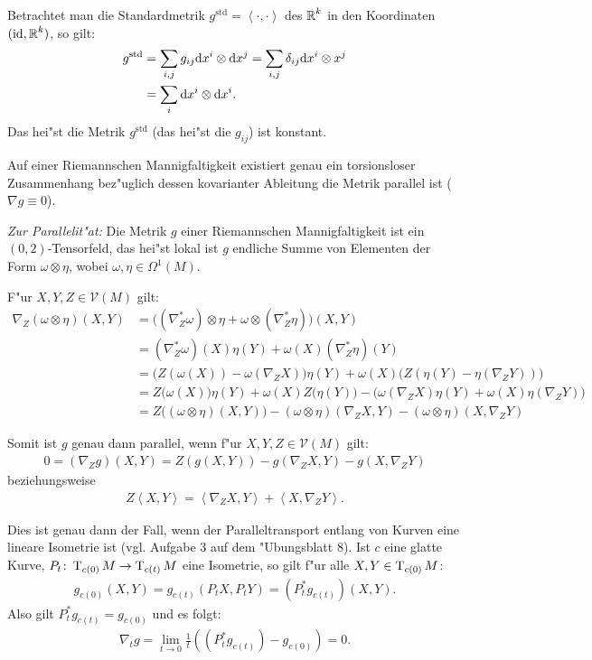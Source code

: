 Betrachtet man die Standardmetrik $g^{\text{std}} = \left<\cdot,\cdot\right>$ des $\operatorname{\mathbb{R}}^k$ in den Koordinaten $(\operatorname{id}, \operatorname{\mathbb{R}}^k)$, so gilt:
\begin{align*}
  g^{\text{std}} & = \sum_{i,j} g_{ij} \mathrm{d} x^i \otimes \mathrm{d} x^j = \sum_{i,j} \delta_{ij} \mathrm{d} x^i \otimes x^j\\
  & = \sum_i \mathrm{d} x^i \otimes \mathrm{d} x^i.
\end{align*}
Das hei"st die Metrik $g^{\text{std}}$ (das hei"st die $g_{ij}$) ist konstant.

\begin{Satz} \label{satz-7-12}
  Auf einer Riemannschen Mannigfaltigkeit existiert genau ein torsionsloser Zusammenhang bez"uglich dessen kovarianter Ableitung die Metrik parallel ist ($\nabla g \equiv 0$).
\end{Satz}

\emph{Zur Parallelit"at:} Die Metrik $g$ einer Riemannschen Mannigfaltigkeit ist ein $(0,2)$-Tensorfeld, das hei"st lokal ist $g$ endliche Summe von Elementen der Form $\omega \otimes \eta$, wobei $\omega, \eta \in \Omega^1(M)$.

F"ur $X,Y,Z \in \mathcal V(M)$ gilt:
\begin{align*}
  \nabla_Z(\omega \otimes \eta)(X,Y) & = \big((\nabla^{*}_Z\omega) \otimes \eta + \omega \otimes (\nabla^{*}_Z \eta)\big)(X,Y)\\
  & = (\nabla^{*}_Z \omega)(X)\eta(Y) + \omega(X)(\nabla^{*}_Z \eta)(Y)\\
  & = \big(Z(\omega(X)) - \omega(\nabla_ZX)\big)\eta(Y) + \omega(X)\big(Z(\eta(Y)-\eta(\nabla_ZY))\big)\\
  & = Z\big(\omega(X)\big)\eta(Y) + \omega(X)Z\big(\eta(Y)\big) - \big(\omega(\nabla_ZX)\eta(Y) + \omega(X)\eta(\nabla_ZY)\big)\\
  & = Z\big((\omega \otimes \eta)(X,Y)\big) - (\omega \otimes \eta)(\nabla_ZX,Y) - (\omega \otimes \eta)(X,\nabla_Z Y)
\end{align*}

Somit ist $g$ genau dann parallel, wenn f"ur $X,Y,Z \in \mathcal V(M)$ gilt:
\begin{align*}
  0 = (\nabla_Z g)(X,Y) = Z(g(X,Y)) - g(\nabla_ZX,Y) - g(X,\nabla_ZY)
\end{align*}
beziehungsweise
\begin{align*}
  Z\left<X,Y\right> = \left<\nabla_ZX,Y\right> + \left<X,\nabla_ZY\right>.
\end{align*}

Dies ist genau dann der Fall, wenn der Paralleltransport entlang von Kurven eine lineare Isometrie ist (vgl. Aufgabe 3 auf dem "Ubungsblatt 8).
Ist $c$ eine glatte Kurve, $P_t \colon \operatorname{T}_{c(0)}M \to \operatorname{T}_{c(t)}M$ eine Isometrie, so gilt f"ur alle $X,Y \in \operatorname{T}_{c(0)}M$: 
\begin{align*}
  g_{c(0)}(X,Y) = g_{c(t)}(P_tX,P_tY) = (P^{*}_tg_{c(t)})(X,Y).
\end{align*}
Also gilt $P_t^{*} g_{c(t)} = g_{c(0)}$ und es folgt:
\begin{align*}
  \nabla_t g = \lim_{t \to 0}\frac{1}{t} \left( (P_t^{*}g_{c(t)}) - g_{c(0)} \right) = 0.
\end{align*}

